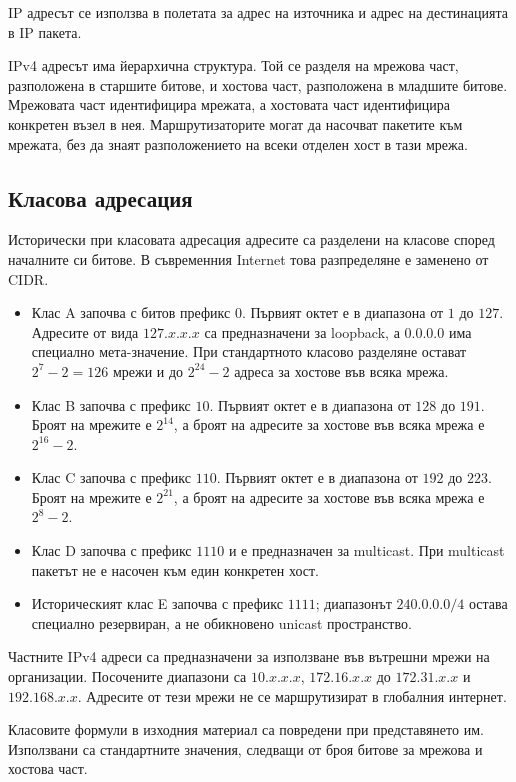 IP адресът се използва в полетата за адрес на източника и адрес на дестинацията в IP пакета.

IPv4 адресът има йерархична структура. Той се разделя на мрежова част, разположена в старшите битове, и хостова част, разположена в младшите битове. Мрежовата част идентифицира мрежата, а хостовата част идентифицира конкретен възел в нея. Маршрутизаторите могат да насочват пакетите към мрежата, без да знаят разположението на всеки отделен хост в тази мрежа.

\subsection{Класова адресация}\label{s:13.4.1}

Исторически при класовата адресация адресите са разделени на класове според началните си битове. В съвременния Internet това разпределяне е заменено от CIDR.

\begin{itemize}
    \item Клас A започва с битов префикс $0$. Първият октет е в диапазона от $1$ до $127$. Адресите от вида $127.x.x.x$ са предназначени за loopback, а $0.0.0.0$ има специално мета-значение. При стандартното класово разделяне остават $2^7-2=126$ мрежи и до $2^{24}-2$ адреса за хостове във всяка мрежа.
    \item Клас B започва с префикс $10$. Първият октет е в диапазона от $128$ до $191$. Броят на мрежите е $2^{14}$, а броят на адресите за хостове във всяка мрежа е $2^{16}-2$.
    \item Клас C започва с префикс $110$. Първият октет е в диапазона от $192$ до $223$. Броят на мрежите е $2^{21}$, а броят на адресите за хостове във всяка мрежа е $2^8-2$.
    \item Клас D започва с префикс $1110$ и е предназначен за multicast. При multicast пакетът не е насочен към един конкретен хост.
    \item Историческият клас E започва с префикс $1111$; диапазонът $240.0.0.0/4$ остава специално резервиран, а не обикновено unicast пространство.
\end{itemize}

Частните IPv4 адреси са предназначени за използване във вътрешни мрежи на организации. Посочените диапазони са $10.x.x.x$, $172.16.x.x$ до $172.31.x.x$ и $192.168.x.x$. Адресите от тези мрежи не се маршрутизират в глобалния интернет.

\begin{supp}[Бележка]
Класовите формули в изходния материал са повредени при представянето им. Използвани са стандартните значения, следващи от броя битове за мрежова и хостова част.
\end{supp}

